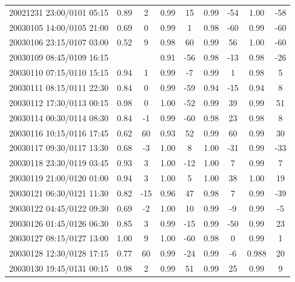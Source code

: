 \documentclass[linenumbers,draft]{agujournal}
\begin{document}
\begin{center}
\begin{longtable}{c||cc|cc|cc|cc}
20021231 23:00/0101 05:15 & 0.89 & 2 & 0.99 & 15 & 0.99 & -54 & 1.00 & -58 \\
20030105 14:00/0105 21:00 & 0.69 & 0 & 0.99 & 1 & 0.98 & -60 & 0.99 & -60 \\
20030106 23:15/0107 03:00 & 0.52 & 9 & 0.98 & 60 & 0.99 & 56 & 1.00 & -60 \\
20030109 08:45/0109 16:15 &  &  & 0.91 & -56 & 0.98 & -13 & 0.98 & -26 \\
20030110 07:15/0110 15:15 & 0.94 & 1 & 0.99 & -7 & 0.99 & 1 & 0.98 & 5 \\
20030111 08:15/0111 22:30 & 0.84 & 0 & 0.99 & -59 & 0.94 & -15 & 0.94 & 8 \\
20030112 17:30/0113 00:15 & 0.98 & 0 & 1.00 & -52 & 0.99 & 39 & 0.99 & 51 \\
20030114 00:30/0114 08:30 & 0.84 & -1 & 0.99 & -60 & 0.98 & 23 & 0.98 & 8 \\
20030116 10:15/0116 17:45 & 0.62 & 60 & 0.93 & 52 & 0.99 & 60 & 0.99 & 30 \\
20030117 09:30/0117 13:30 & 0.68 & -3 & 1.00 & 8 & 1.00 & -31 & 0.99 & -33 \\
20030118 23:30/0119 03:45 & 0.93 & 3 & 1.00 & -12 & 1.00 & 7 & 0.99 & 7 \\
20030119 21:00/0120 01:00 & 0.94 & 3 & 1.00 & 5 & 1.00 & 38 & 1.00 & 19 \\
20030121 06:30/0121 11:30 & 0.82 & -15 & 0.96 & 47 & 0.98 & 7 & 0.99 & -39 \\
20030122 04:45/0122 09:30 & 0.69 & -2 & 1.00 & 10 & 0.99 & -9 & 0.99 & -5 \\
20030126 01:45/0126 06:30 & 0.85 & 3 & 0.99 & -15 & 0.99 & -50 & 0.99 & 23 \\
20030127 08:15/0127 13:00 & 1.00 & 9 & 1.00 & -60 & 0.98 & 0 & 0.99 & 1 \\
20030128 12:30/0128 17:15 & 0.77 & 60 & 0.99 & -24 & 0.99 & -6 & 0.988 & 20 \\
20030130 19:45/0131 00:15 & 0.98 & 2 & 0.99 & 51 & 0.99 & 25 & 0.99 & 9 \\
\end{longtable}
\end{center}

\pagebreak
\end{document}
